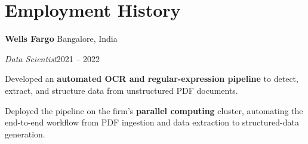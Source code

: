 \section{\sc Employment History}
\textbf{Wells Fargo} \hfill Bangalore, India\\
{\parfillskip=0pt \emph{Data Scientist}\hfill 2021 -- 2022\par}
\begin{list1}
    \item Developed an \textbf{automated OCR and regular-expression pipeline} to detect, extract, and structure data from unstructured PDF documents.

\item Deployed the pipeline on the firm's \textbf{parallel computing} cluster, automating the end-to-end workflow from PDF ingestion and data extraction to structured-data generation.
\end{list1}
\endinput
